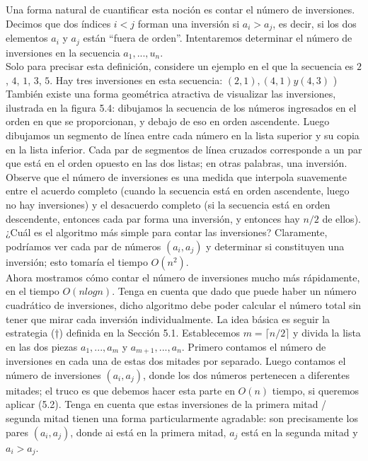 \documentclass[a4paper, 12pt]{book}
\theoremstyle{dotless}
\begin{document}
Una forma natural de cuantificar esta noción es contar el número de inversiones. Decimos que dos índices $i<j$ forman una inversión si $a_i> a_j$, es decir, si los dos elementos $a_i$ y $a_j$ están ``fuera de orden''. Intentaremos determinar el número de inversiones en la secuencia $a_1, ... , u_n$.\\

Solo para precisar esta definición, considere un ejemplo en el que la secuencia es $2$, $4$, $1$, $3$, $5$. Hay tres inversiones en esta secuencia: $(2, 1), (4, 1) y (4, 3)$ ) También existe una forma geométrica atractiva de visualizar las inversiones, ilustrada en la figura 5.4: dibujamos la secuencia de los números ingresados en el orden en que se proporcionan, y debajo de eso en orden ascendente. Luego dibujamos un segmento de línea entre cada número en la lista superior y su copia en la lista inferior. Cada par de segmentos de línea cruzados corresponde a un par que está en el orden opuesto en las dos listas; en otras palabras, una inversión.\\

Observe que el número de inversiones es una medida que interpola suavemente entre el acuerdo completo (cuando la secuencia está en orden ascendente, luego no hay inversiones) y el desacuerdo completo (si la secuencia está en orden descendente, entonces cada par forma una inversión, y entonces hay $n/2$ de ellos).\\

¿Cuál es el algoritmo más simple para contar las inversiones? Claramente, podríamos ver cada par de números $(a_i, a_j)$ y determinar si constituyen una inversión; esto tomaría el tiempo $O(n^2)$.\\

Ahora mostramos cómo contar el número de inversiones mucho más rápidamente, en el tiempo $O(nlogn)$. Tenga en cuenta que dado que puede haber un número cuadrático de inversiones, dicho algoritmo debe poder calcular el número total sin tener que mirar cada inversión individualmente. La idea básica es seguir la estrategia (†) definida en la Sección 5.1. Establecemos $m =\lceil n / 2 \rceil$  y divida la lista en las dos piezas $a_1, ..., a_m$ y $a_{m+1}, ..., a_n$. Primero contamos el número de inversiones en cada una de estas dos mitades por separado. Luego contamos el número de inversiones $(a_i, a_j)$, donde los dos números pertenecen a diferentes mitades; el truco es que debemos hacer esta parte en $O(n)$ tiempo, si queremos aplicar (5.2). Tenga en cuenta que estas inversiones de la primera mitad / segunda mitad tienen una forma particularmente agradable: son precisamente los pares $(a_i, a_j)$, donde ai está en la primera mitad, $a_j$ está en la segunda mitad y $a_i> a_j$.\\
\end{document}

